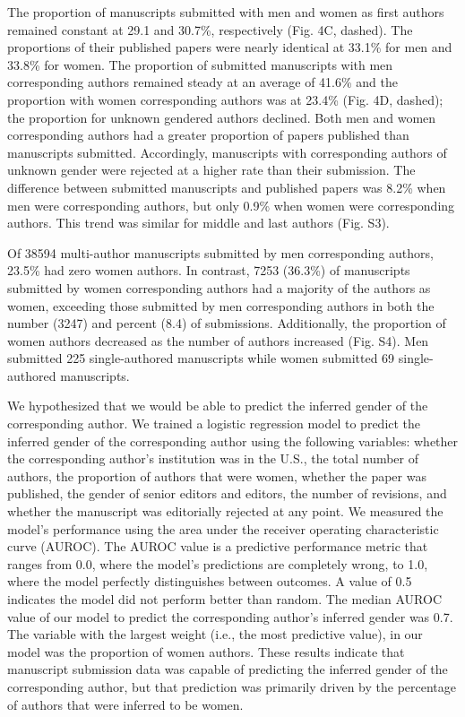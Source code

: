 \documentclass[11pt,]{article}
\begin{document}
The proportion of manuscripts submitted with men and women as first
authors remained constant at 29.1 and 30.7\%, respectively (Fig. 4C,
dashed). The proportions of their published papers were nearly identical
at 33.1\% for men and 33.8\% for women. The proportion of submitted
manuscripts with men corresponding authors remained steady at an average
of 41.6\% and the proportion with women corresponding authors was at
23.4\% (Fig. 4D, dashed); the proportion for unknown gendered authors
declined. Both men and women corresponding authors had a greater
proportion of papers published than manuscripts submitted. Accordingly,
manuscripts with corresponding authors of unknown gender were rejected
at a higher rate than their submission. The difference between submitted
manuscripts and published papers was 8.2\% when men were corresponding
authors, but only 0.9\% when women were corresponding authors. This
trend was similar for middle and last authors (Fig. S3).

Of 38594 multi-author manuscripts submitted by men corresponding
authors, 23.5\% had zero women authors. In contrast, 7253 (36.3\%) of
manuscripts submitted by women corresponding authors had a majority of
the authors as women, exceeding those submitted by men corresponding
authors in both the number (3247) and percent (8.4) of submissions.
Additionally, the proportion of women authors decreased as the number of
authors increased (Fig. S4). Men submitted 225 single-authored
manuscripts while women submitted 69 single-authored manuscripts.

We hypothesized that we would be able to predict the inferred gender of
the corresponding author. We trained a logistic regression model to
predict the inferred gender of the corresponding author using the
following variables: whether the corresponding author's institution was
in the U.S., the total number of authors, the proportion of authors that
were women, whether the paper was published, the gender of senior
editors and editors, the number of revisions, and whether the manuscript
was editorially rejected at any point. We measured the model's
performance using the area under the receiver operating characteristic
curve (AUROC). The AUROC value is a predictive performance metric that
ranges from 0.0, where the model's predictions are completely wrong, to
1.0, where the model perfectly distinguishes between outcomes. A value
of 0.5 indicates the model did not perform better than random. The
median AUROC value of our model to predict the corresponding author's
inferred gender was 0.7. The variable with the largest weight (i.e., the
most predictive value), in our model was the proportion of women
authors. These results indicate that manuscript submission data was
capable of predicting the inferred gender of the corresponding author,
but that prediction was primarily driven by the percentage of authors
that were inferred to be women.
\end{document}
